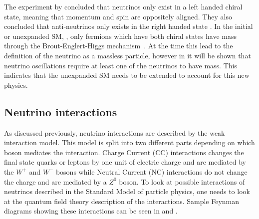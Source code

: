 The experiment by \citeauthor{1Helicity} concluded that neutrinos only exist in a left handed chiral state, meaning that momentum and spin are oppositely aligned. They also concluded that anti-neutrinos only exists in the right handed state \cite{1Helicity}. In the initial or unexpanded SM, \cite{34doi:10.1142/9789812562203_0002}, only fermions which have both chiral states have mass through the Brout\hyp{}Englert\hyp{}Higgs mechanism~\cite{35Higgs}. At the time this lead to the definition of the neutrino as a massless particle, however in  it will be shown that neutrino oscillations require at least one of the neutrinos to have mass. This indicates that the unexpanded SM needs to be extended to account for this new physics.

\subsection{Neutrino interactions}\label{subsection:Neutrino interactions}
As discussed previously, neutrino interactions are described by the weak interaction model. This model is split into two different parts depending on which boson mediates the interaction.
Charge Current (CC) interactions changes the final state quarks or leptons by one unit of electric charge and are mediated by the $W^+$ and $W^-$ bosons while Neutral Current (NC) interactions do not change the charge and are mediated by a $Z^0$ boson. 
To look at possible interactions of neutrinos described in the Standard Model of particle physics, one needs to look at the quantum field theory description of the interactions\cite{3Peskin, 2Hallsjo}. Sample Feynman diagrams showing these interactions can be seen in  and .

